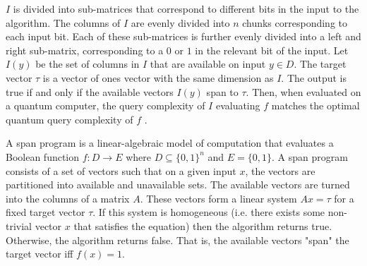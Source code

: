 $I$ is divided into sub-matrices that
correspond to different bits in the input to the
algorithm.
The columns of $I$ are evenly divided into
$n$ chunks corresponding to each input bit.
Each of these sub-matrices is further evenly divided into a left and
right sub-matrix, corresponding to a $0$ or $1$
in the relevant bit of the input.
Let $I(y)$ be the set of columns in 
$I$ that are available on input $y \in D$.
The target vector $\tau$ 
is a vector of ones vector with the same 
dimension as $I$.
The output is true if and only if the available
vectors $I(y)$ span to $\tau$.
Then, when evaluated on a quantum computer,
the query complexity of $I$ evaluating $f$ matches
the optimal quantum query complexity of $f$
\cite{reichardt2009span}.
















\begin{comment}

The closed form calculation of the optimal quantum query complexity for a given function has been derived previously \cite{childs} \cite{reichardt2009span}. However, we have not found a suitable implementation to make these calculation and we have found that general purpose SDP solvers are not well equipped for this problem.

The focus of this research is to calculate the optimal quantum
query complexity of a given Boolean function, as well as
provide the query optimal quantum algorithm to evaluate the
Boolean function. As with algorithm design for any computer,
we are mainly worried about the run time on the worst-case
input. We use the query complexity of a quantum algorithm to
establish a lower bound on the run time as each query of the
input will take some amount of time.


Boolean functions
Consider a Boolean function $f$ such that
$f: D \rightarrow E$ where 
$D \subseteq {\{0,1\}}^n$ and $E \subseteq {\{0,1\}}$.

Query complexity is how many input bits we
need in the worst case to find $f(x)$

An algorithm evaluates $f$ and is query optimal
if it evaluates $f$ in the least number of queries
\end{comment}

A span program is a linear-algebraic model of computation that
evaluates a Boolean function $f: D \rightarrow E$
where $D \subseteq \{0,1\}^n$ and $E = \{0,1\}$.
A span program consists of a set of
vectors such that on a given input $x$, the vectors are
partitioned into available and unavailable sets.
The available vectors are turned into the columns of a matrix $A$.
These vectors form a linear system $Ax = \tau$
for a fixed target vector $\tau$.
If this system is homogeneous (i.e. there exists
some non-trivial vector $x$ that satisfies the equation)
then the algorithm returns true.
Otherwise, the algorithm returns false.
That is, the available vectors "span" the target vector
iff $f(x) =1$.


